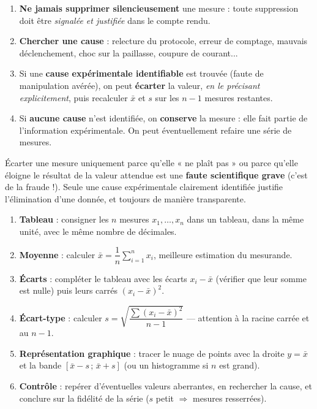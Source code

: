 \documentclass[11pt]{article}
\begin{document}
\begin{methode}
\begin{enumerate}
\item \textbf{Ne jamais supprimer silencieusement} une mesure : toute suppression doit être \emph{signalée et justifiée} dans le compte rendu.
\item \textbf{Chercher une cause} : relecture du protocole, erreur de comptage, mauvais déclenchement, choc sur la paillasse, coupure de courant...
\item Si une \textbf{cause expérimentale identifiable} est trouvée (faute de manipulation avérée), on peut \textbf{écarter} la valeur, \emph{en le précisant explicitement}, puis recalculer $\bar{x}$ et $s$ sur les $n-1$ mesures restantes.
\item Si \textbf{aucune cause} n'est identifiée, on \textbf{conserve} la mesure : elle fait partie de l'information expérimentale. On peut éventuellement refaire une série de mesures.
\end{enumerate}
\end{methode}

\begin{attention}
Écarter une mesure uniquement parce qu'elle « ne plaît pas » ou parce qu'elle éloigne le résultat de la valeur attendue est une \textbf{faute scientifique grave} (c'est de la fraude !). Seule une cause expérimentale clairement identifiée justifie l'élimination d'une donnée, et toujours de manière transparente.
\end{attention}

\begin{methode}
\begin{enumerate}
\item \textbf{Tableau} : consigner les $n$ mesures $x_1, \ldots, x_n$ dans un tableau, dans la même unité, avec le même nombre de décimales.
\item \textbf{Moyenne} : calculer $\bar{x} = \dfrac{1}{n}\displaystyle\sum_{i=1}^{n} x_i$, meilleure estimation du mesurande.
\item \textbf{Écarts} : compléter le tableau avec les écarts $x_i - \bar{x}$ (vérifier que leur somme est nulle) puis leurs carrés $(x_i - \bar{x})^2$.
\item \textbf{Écart-type} : calculer $s = \sqrt{\dfrac{\sum (x_i - \bar{x})^2}{n-1}}$ — attention à la racine carrée et au $n-1$.
\item \textbf{Représentation graphique} : tracer le nuage de points avec la droite $y = \bar{x}$ et la bande $[\bar{x}-s \,;\, \bar{x}+s]$ (ou un histogramme si $n$ est grand).
\item \textbf{Contrôle} : repérer d'éventuelles valeurs aberrantes, en rechercher la cause, et conclure sur la fidélité de la série ($s$ petit $\Rightarrow$ mesures resserrées).
\end{enumerate}
\end{methode}
\end{document}

